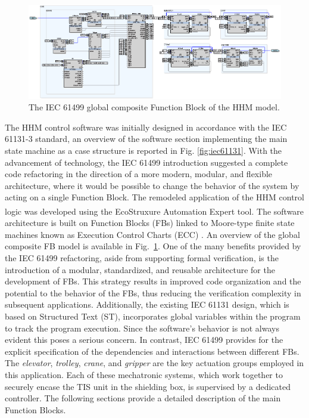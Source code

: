 \begin{bibunit}
\begin{figure}
	\centering
    \includegraphics[width=\textwidth]{MX_Papers/Paper4/pictures/lilli05.eps}
    \caption{The IEC 61499 global composite Function Block of the HHM model.} 
    \label{fig:model}
\end{figure}

The HHM control software was initially designed in accordance with the IEC 61131-3 standard, an overview of the software section implementing the main state machine as a case structure is reported in Fig. \ref{fig:iec61131}.
With the advancement of technology, the IEC 61499 introduction suggested a complete code refactoring in the direction of a more modern, modular, and flexible architecture, where it would be possible to change the behavior of the system by acting on a single Function Block. 
The remodeled application of the HHM control logic was developed using the EcoStruxure\textsuperscript{\texttrademark} Automation Expert tool. The software architecture is built on Function Blocks (FBs) linked to Moore-type finite state machines known as Execution Control Charts (ECC) \cite{Lee2017}. An overview of the global composite FB model is available in \mbox{Fig. \ref{fig:model}}.
One of the many benefits provided by the IEC 61499 refactoring, aside from supporting formal verification, is the introduction of a modular, standardized, and reusable architecture for the development of FBs.
This strategy results in improved code organization and the potential to  the behavior of the FBs, thus reducing the verification complexity in subsequent applications. Additionally, the existing IEC 61131 design, which is based on Structured Text (ST), incorporates global variables within the program to track the program execution.
Since the software's behavior is not always evident this poses a serious concern. 
In contrast, IEC 61499 provides for the explicit specification of the dependencies and interactions between different FBs.
The \textit{elevator}, \textit{trolley}, \textit{crane}, and \textit{gripper} are the key actuation groups employed in this application. Each of these mechatronic systems, which work together to securely encase the TIS unit in the shielding box, is supervised by a dedicated controller. The following sections provide a detailed description of the main Function Blocks.


\end{bibunit}
